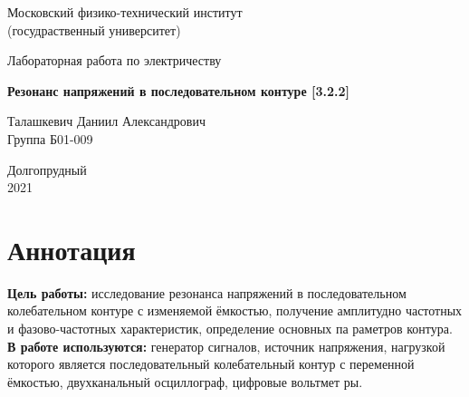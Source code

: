\documentclass[a4paper, 12pt]{article}%
\begin{document}


\begin{titlepage}

	\newpage
	\begin{center}
		\normalsize Московский физико-технический институт \\(госудраственный 			университет)
	\end{center}

	\vspace{6em}

	\begin{center}
		\Large Лабораторная работа по электричеству\\
	\end{center}

	\vspace{1em}

	\begin{center}
		\large \textbf{Резонанс напряжений в последовательном контуре [3.2.2]}
	\end{center}

	\vspace{2em}

	\begin{center}
		\large Талашкевич Даниил Александрович\\
		Группа Б01-009
	\end{center}

	\vspace{\fill}

	\begin{center}
	Долгопрудный \\2021
	\end{center}
	
\end{titlepage}



	\thispagestyle{empty}
	\newpage
	\tableofcontents
	\newpage
	\setcounter{page}{1}


		
\section{Аннотация}
\textbf{Цель работы:} исследование резонанса напряжений в последовательном
колебательном контуре с изменяемой ёмкостью, получение амплитудно­
частотных и фазово-частотных характеристик, определение основных па­
раметров контура.\\
\textbf{В работе используются:} генератор сигналов, источник напряжения,
нагрузкой которого является последовательный колебательный контур с
переменной ёмкостью, двухканальный осциллограф, цифровые вольтмет­
ры.
\end{document}
